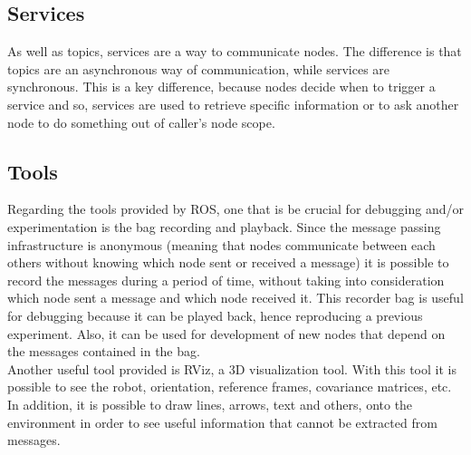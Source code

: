 \subsection{Services}
\label{subsec:chapter1:ros:services}
As well as topics, services are a way to communicate nodes. The difference is that topics are an asynchronous way of communication, while services are synchronous. This is a key difference, because nodes decide when to trigger a service and so, services are used to retrieve specific information or to ask another node to do something out of caller's node scope.


\subsection{Tools}
\label{chapter1:ros:tools}
Regarding the tools provided by ROS, one that is be crucial for debugging and/or experimentation is the bag recording and playback. Since the message passing infrastructure is anonymous (meaning that nodes communicate between each others without knowing which node sent or received a message) it is possible to record the messages during a period of time, without taking into consideration which node sent a message and which node received it. This recorder bag is useful for debugging because it can be played back, hence reproducing a previous experiment. Also, it can be used for development of new nodes that depend on the messages contained in the bag.\\

Another useful tool provided is \ac{RViz}, a 3D visualization tool. With this tool it is possible to see the robot, orientation, reference frames, covariance matrices, etc. In addition, it is possible to draw lines, arrows, text and others, onto the environment in order to see useful information that cannot be extracted from messages.

